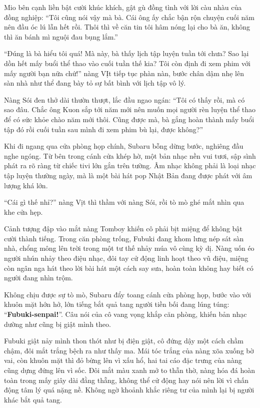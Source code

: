 \documentclass[../main.tex]{subfiles}
\begin{document}
Mio bên cạnh liền bật cười khúc khích, gật gù đồng tình với lời càu nhàu của đồng nghiệp: ``Tôi cũng nói vậy mà bà. Cái ông ấy chắc bận rộn chuyện cuối năm nên đầu óc lú lẫn hết rồi. Thôi thì về căn tin tôi hâm nóng lại cho bà ăn, không thì ăn bánh mì nguội đau bụng lắm.''

``Đúng là bà hiểu tôi quá! Mà này, bà thấy lịch tập luyện tuần tới chưa? Sao lại dồn hết mấy buổi thể thao vào cuối tuần thế kia? Tôi còn định đi xem phim với mấy người bạn nữa chứ!'' nàng VỊt tiếp tục phàn nàn, bước chân dậm nhẹ lên sàn nhà như thể đang bày tỏ sự bất bình với lịch tập vô lý.

Nàng Sói đen thở dài thườn thượt, lắc đầu ngao ngán: ``Tôi có thấy rồi, mà có sao đâu. Chắc ông Kuon sắp tới năm mới nên muốn mọi người rèn luyện thể thao để có sức khỏe chào năm mới thôi. Cũng được mà, bà gắng hoàn thành mấy buổi tập đó rồi cuối tuần sau mình đi xem phim bù lại, được không?''

Khi đi ngang qua cửa phòng họp chính, Subaru bỗng dừng bước, nghiêng đầu nghe ngóng. Từ bên trong cánh cửa khép hờ, một bản nhạc nền vui tươi, sập sình phát ra rõ ràng từ chiếc tivi lớn gắn trên tường. Âm nhạc không phải là loại nhạc tập luyện thường ngày, mà là một bài hát pop Nhật Bản đang được phát với âm lượng khá lớn.

``Cái gì thế nhỉ?'' nàng Vịt thì thầm với nàng Sói, rồi tò mò ghé mắt nhìn qua khe cửa hẹp.

Cảnh tượng đập vào mắt nàng Tomboy khiến cô phải bịt miệng để không bật cười thành tiếng. Trong căn phòng trống, Fubuki đang khom lưng nép sát sàn nhà, chổng mông lên trời trong một tư thế nhảy múa vô cùng kỳ dị. Nàng uốn éo người nhún nhảy theo điệu nhạc, đôi tay cử động linh hoạt theo vũ điệu, miệng còn ngân nga hát theo lời bài hát một cách say sưa, hoàn toàn không hay biết có người đang nhìn trộm.


Không chịu được sự tò mò, Subaru đẩy toang cánh cửa phòng họp, bước vào với khuôn mặt hớn hở, lớn tiếng bắt quả tang người tiền bối đang lúng túng: ``\textbf{Fubuki-senpai!}''. Câu nói của cô vang vọng khắp căn phòng, khiến bản nhạc dường như cũng bị giật mình theo.

Fubuki giật nảy mình thon thót như bị điện giật, cô đứng dậy một cách chầm chậm, đôi mắt trắng bệch ra như thấy ma. Mái tóc trắng của nàng xõa xuống bờ vai, còn khuôn mặt thì đỏ bừng lên vì xấu hổ, hai tai cáo đặc trưng của nàng cũng dựng đứng lên vì sốc. Đôi mắt màu xanh mở to thẫn thờ, nàng hóa đá hoàn toàn trong mấy giây dài đằng thẵng, không thể cử động hay nói nên lời vì chấn động tâm lý quá nặng nề. Không ngờ khoảnh khắc riêng tư của mình lại bị người khác bắt quả tang.
\end{document}

